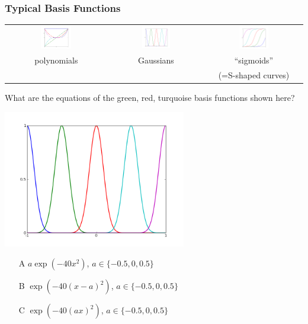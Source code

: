 \documentclass[USenglish,pdftex,compress,10pt,svgnamesi,handout]{beamer}
\begin{document}
\begin{frame}
	\frametitle{Typical Basis Functions}
\hspace{-0.8cm}\begin{tabular}{ccc}
	\includegraphics[width=0.32\textwidth]{pics/poly_bf.png}&
	\includegraphics[width=0.32\textwidth]{pics/gauss_bf.png}&
	\includegraphics[width=0.32\textwidth]{pics/sig_bf.png}\\
	polynomials & Gaussians & ``sigmoids''\\
	& & (=S-shaped curves)
\end{tabular}
\end{frame}

\begin{poll}
What are the equations of the green, red, turquoise basis functions shown here?

\includegraphics[width=0.6\textwidth]{pics/gauss_bf.png}

\begin{enumerate}
\item[A] $a\exp(-40x^2)$, $a\in\{-0.5, 0, 0.5\}$
\item[B] $\exp(-40(x-a)^2)$, $a\in\{-0.5, 0, 0.5\}$
\item[C]$\exp(-40(ax)^2)$, $a\in\{-0.5, 0, 0.5\}$
\end{enumerate}
\end{poll}
\end{document}
